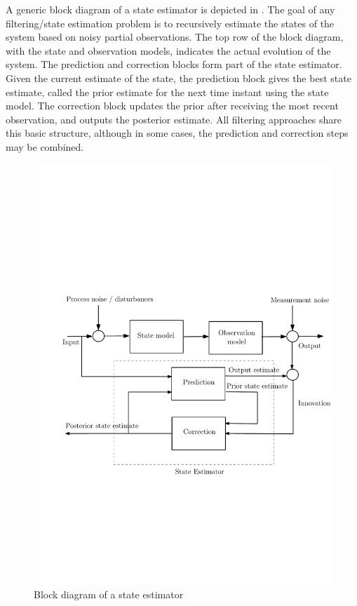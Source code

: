 A generic block diagram of a state estimator is depicted in . The goal of any filtering/state estimation problem is to recursively estimate the states of the system based on noisy partial observations. The top row of the block diagram, with the state and observation models, indicates the actual evolution of the system. The prediction and correction blocks form part of the state estimator. Given the current estimate of the state, the prediction block gives the best state estimate, called the prior estimate for the next time instant using the state model. The correction block updates the prior after receiving the most recent observation, and outputs the posterior estimate. All filtering approaches share this basic structure, although in some cases, the prediction and correction steps may be combined.  

\begin{figure}
	\includegraphics[width=7in]{images/Chap1_state_est_block}
	\caption{Block diagram of a state estimator}
	\label{Fig:state_estimator}
\end{figure} 

